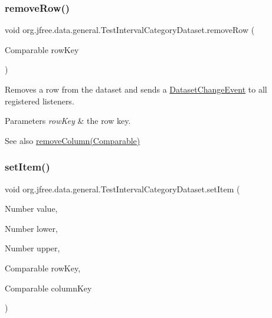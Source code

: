 \subsubsection{\texorpdfstring{remove\+Row()}{removeRow()}\hspace{0.1cm}{\footnotesize\ttfamily [2/2]}}
{\footnotesize\ttfamily void org.\+jfree.\+data.\+general.\+Test\+Interval\+Category\+Dataset.\+remove\+Row (\begin{DoxyParamCaption}\item[{Comparable}]{row\+Key }\end{DoxyParamCaption})}

Removes a row from the dataset and sends a \mbox{\hyperlink{classorg_1_1jfree_1_1data_1_1general_1_1_dataset_change_event}{Dataset\+Change\+Event}} to all registered listeners.


\begin{DoxyParams}{Parameters}
{\em row\+Key} & the row key.\\
\hline
\end{DoxyParams}
\begin{DoxySeeAlso}{See also}
\mbox{\hyperlink{classorg_1_1jfree_1_1data_1_1general_1_1_test_interval_category_dataset_aaac9deaaa8f4e8da7c6b15a0cc31b959}{remove\+Column(\+Comparable)}} 
\end{DoxySeeAlso}
\mbox{\label{classorg_1_1jfree_1_1data_1_1general_1_1_test_interval_category_dataset_aa641823ad9ab6f84e2523fa57ce3ad21}} 
\subsubsection{\texorpdfstring{set\+Item()}{setItem()}\hspace{0.1cm}{\footnotesize\ttfamily [1/2]}}
{\footnotesize\ttfamily void org.\+jfree.\+data.\+general.\+Test\+Interval\+Category\+Dataset.\+set\+Item (\begin{DoxyParamCaption}\item[{Number}]{value,  }\item[{Number}]{lower,  }\item[{Number}]{upper,  }\item[{Comparable}]{row\+Key,  }\item[{Comparable}]{column\+Key }\end{DoxyParamCaption})}


